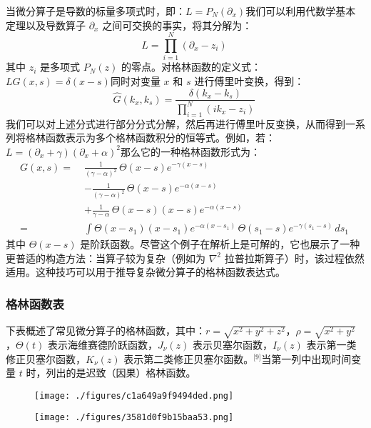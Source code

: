 当微分算子是导数的标量多项式时，即：$L = P_N(\partial_x)$我们可以利用代数学基本定理以及导数算子 $\partial_x$ 之间可交换的事实，将其分解为：
$$
L = \prod_{i=1}^{N} (\partial_x - z_i)~
$$
其中 $z_i$ 是多项式 $P_N(z)$ 的零点。对格林函数的定义式：$L G(x, s) = \delta(x - s)$同时对变量 $x$ 和 $s$ 进行傅里叶变换，得到：
$$
\widehat{G}(k_x, k_s) = \frac{\delta(k_x - k_s)}{\prod_{i=1}^{N} (ik_x - z_i)}~
$$
我们可以对上述分式进行部分分式分解，然后再进行傅里叶反变换，从而得到一系列将格林函数表示为多个格林函数积分的恒等式。例如，若：$L = (\partial_x + \gamma)(\partial_x + \alpha)^2$那么它的一种格林函数形式为：
$$
\begin{aligned}
G(x, s) =\;& \frac{1}{(\gamma - \alpha)^2} \, \Theta(x - s) e^{-\gamma(x - s)} \\
& - \frac{1}{(\gamma - \alpha)^2} \, \Theta(x - s) e^{-\alpha(x - s)} \\
& + \frac{1}{\gamma - \alpha} \, \Theta(x - s) (x - s) e^{-\alpha(x - s)} \\
=\;& \int \Theta(x - s_1)(x - s_1) e^{-\alpha(x - s_1)} \, \Theta(s_1 - s) e^{-\gamma(s_1 - s)} \, ds_1
\end{aligned}~
$$
其中 $\Theta(x - s)$ 是阶跃函数。尽管这个例子在解析上是可解的，它也展示了一种更普适的构造方法：当算子较为复杂（例如为 $\nabla^2$ 拉普拉斯算子）时，该过程依然适用。这种技巧可以用于推导复杂微分算子的格林函数表达式。
\subsubsection{格林函数表}
下表概述了常见微分算子的格林函数，其中：$r = \sqrt{x^2 + y^2 + z^2}$，$\rho = \sqrt{x^2 + y^2}$，$\Theta(t)$ 表示海维赛德阶跃函数，$J_{\nu}(z)$ 表示贝塞尔函数，$I_{\nu}(z)$ 表示第一类修正贝塞尔函数，$K_{\nu}(z)$ 表示第二类修正贝塞尔函数。\(^\text{[9]}\)当第一列中出现时间变量 $t$ 时，列出的是迟致（因果）格林函数。
\begin{figure}[ht]
\centering
\texttt{[image: ./figures/c1a649a9f9494ded.png]}
\caption{} \label{fig_GLhs_3}
\end{figure}
\begin{figure}[ht]
\centering
\texttt{[image: ./figures/3581d0f9b15baa53.png]}
\caption{} \label{fig_GLhs_2}
\end{figure}
